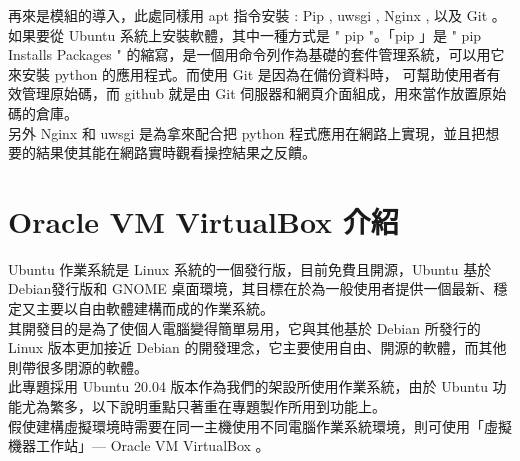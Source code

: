 \documentclass[14pt,a4paper]{report}  %
\begin{document}
 再來是模組的導入，此處同樣用 apt 指令安裝 : Pip , uwsgi , Nginx  , 以及 Git 。如果要從 Ubuntu 系統上安裝軟體，其中一種方式是 " pip "。「pip 」是 " pip Installs Packages " 的縮寫，是一個用命令列作為基礎的套件管理系統，可以用它來安裝 python 的應用程式。而使用 Git 是因為在備份資料時， 可幫助使用者有效管理原始碼，而 github 就是由 Git 伺服器和網頁介面組成，用來當作放置原始碼的倉庫。\\
 另外 Nginx 和 uwsgi 是為拿來配合把 python 程式應用在網路上實現，並且把想要的結果使其能在網路實時觀看操控結果之反饋。
\section{Oracle VM VirtualBox 介紹}
 Ubuntu 作業系統是 Linux 系統的一個發行版，目前免費且開源，Ubuntu 基於 Debian發行版和 GNOME 桌面環境，其目標在於為一般使用者提供一個最新、穩定又主要以自由軟體建構而成的作業系統。\\
 
 其開發目的是為了使個人電腦變得簡單易用，它與其他基於 Debian 所發行的 Linux 版本更加接近 Debian 的開發理念，它主要使用自由、開源的軟體，而其他則帶很多閉源的軟體。\\
 
 此專題採用 Ubuntu 20.04 版本作為我們的架設所使用作業系統，由於 Ubuntu 功能尤為繁多，以下說明重點只著重在專題製作所用到功能上。\\
假使建構虛擬環境時需要在同一主機使用不同電腦作業系統環境，則可使用「虛擬機器工作站」— Oracle VM VirtualBox 。\\
\end{document}

